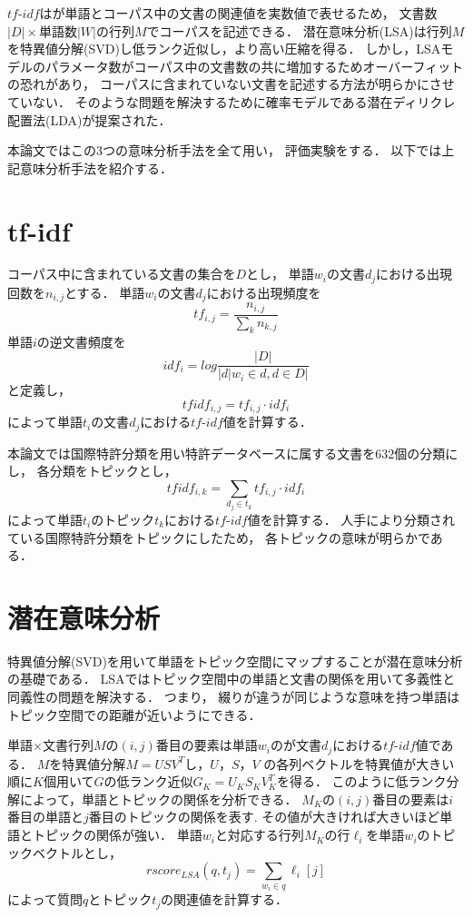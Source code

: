 \documentclass[master]{suribt}
\theoremstyle{definition}
\begin{document}
 $tf\text{-}idf$はが単語とコーパス中の文書の関連値を実数値で表せるため，
 文書数$|D| \times$単語数$|W|$の行列$M$でコーパスを記述できる．
 潜在意味分析(LSA)は行列$M$を特異値分解(SVD)し低ランク近似し，より高い圧縮を得る．
 しかし，LSAモデルのパラメータ数がコーパス中の文書数の共に増加するためオーバーフィットの恐れがあり，
 コーパスに含まれていない文書を記述する方法が明らかにさせていない．
 そのような問題を解決するために確率モデルである潜在ディリクレ配置法(LDA)が提案された．

 本論文ではこの3つの意味分析手法を全て用い，
 評価実験をする．
 以下では上記意味分析手法を紹介する．

 \section{tf-idf}
 コーパス中に含まれている文書の集合を$D$とし，
 単語$w_i$の文書$d_j$における出現回数を$n_{i,j}$とする．
 単語$w_i$の文書$d_j$における出現頻度を
 \begin{equation}
 tf_{i,j} = \frac{n_{i,j}}{\sum_k n_{k,j}}
 \end{equation}
 単語$i$の逆文書頻度を
 \begin{equation}
 idf_i = log \frac{|D|}{|d|w_i \in d, d \in D|}
 \end{equation}
 と定義し，
 \begin{equation}
 tfidf_{i,j} = tf_{i,j} \cdot idf_i
 \end{equation}
 によって単語$t_i$の文書$d_j$における$tf\text{-}idf$値を計算する．
 
 本論文では国際特許分類を用い特許データベースに属する文書を$632$個の分類にし，
 各分類をトピックとし，
 \begin{equation}
 tfidf_{i,k} = \sum_{d_j \in t_k}tf_{i,j} \cdot idf_i
 \end{equation}
 によって単語$t_i$のトピック$t_k$における$tf\text{-}idf$値を計算する．
 人手により分類されている国際特許分類をトピックにしたため，
 各トピックの意味が明らかである．

 \section{潜在意味分析} \label{s:LSA}
 特異値分解(SVD)を用いて単語をトピック空間にマップすることが潜在意味分析の基礎である．
 LSAではトピック空間中の単語と文書の関係を用いて多義性と同義性の問題を解決する．
 つまり， 綴りが違うが同じような意味を持つ単語はトピック空間での距離が近いようにできる．

 単語$\times$文書行列$M$の$(i,j)$番目の要素は単語$w_i$のが文書$d_j$における$tf\text{-}idf$値である．
 $M$を特異値分解$M = USV^T$し，$U$，$S$，$V$ の各列ベクトルを特異値が大きい順に$K$個用いて$G$の低ランク近似$G_K=U_KS_KV_{K}^T$を得る．
 このように低ランク分解によって，単語とトピックの関係を分析できる．
 $M_K$の$(i,j)$番目の要素は$i$番目の単語と$j$番目のトピックの関係を表す.
 その値が大きければ大きいほど単語とトピックの関係が強い．
 単語$w_i$と対応する行列$M_K$の行$\ell_i$を単語$w_i$のトピックベクトルとし，
 \begin{equation}
 rscore_{LSA}(q,t_j) = \sum_{w_i \in q}\ell_i[j]
 \end{equation}
 によって質問$q$とトピック$t_j$の関連値を計算する．
 
\end{document}
